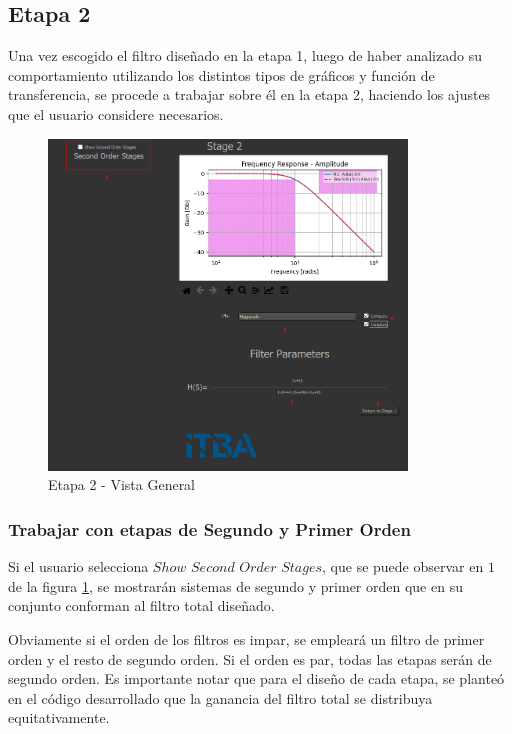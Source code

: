 \subsection{Etapa 2}

Una vez escogido el filtro diseñado en la etapa 1, luego de haber analizado su comportamiento utilizando los distintos
tipos de gráficos y función de transferencia, se procede a trabajar sobre él en la etapa 2, haciendo los ajustes que el usuario considere necesarios.

\begin{figure}[H]
    \centering
    \includegraphics[width=0.85\textwidth]{../Ejercicio1-FilterTool/Imagenes/con-plantilla.png}
    \caption{Etapa 2 - Vista General}
    \label{Etapa2}
\end{figure}

\subsubsection{Trabajar con etapas de Segundo y Primer Orden}

Si el usuario selecciona $Show$ $Second$ $Order$ $Stages$, que se puede observar en $1$
de la figura \ref{Etapa2}, se mostrarán sistemas de segundo y primer orden que en su conjunto
conforman al filtro total diseñado.

Obviamente si el orden de los filtros es impar, se empleará un filtro de primer orden y el resto de segundo orden.
Si el orden es par, todas las etapas serán de segundo orden. Es importante notar que para el diseño de cada etapa,
se planteó en el código desarrollado que la ganancia del filtro total se distribuya equitativamente.

